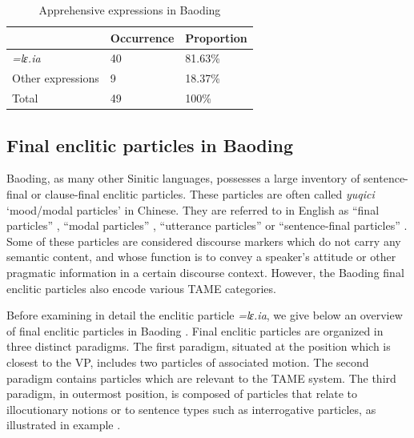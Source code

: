 \documentclass[output=paper,colorlinks,citecolor=brown, language=chinese]{langscibook}
\begin{document}
\begin{table}
\begin{tabularx}{.8\textwidth}{lYY}
\lsptoprule
 &  {Occurrence} &  {Proportion} \\
\midrule
\textit{=lɛ.ia}         & 40        & 81.63\%   \\
Other expressions       & 9         & 18.37\%   \\
\midrule
Total                   & 49        & 100\%     \\
\midrule
\end{tabularx}
\caption{Apprehensive expressions in Baoding}
\label{tab:song:1}
\end{table}


\subsection{Final enclitic particles in Baoding}
\label{subsec:finalparticle}

Baoding, as many other Sinitic languages, possesses a large inventory of sentence-final or clause-final enclitic particles. These particles are often called \textit{yuqici} `mood/modal particles' in Chinese. They are referred to in English as ``final particles'' \citep[149]{Chao1968}, ``modal particles'' \citep{Chappell1991}, ``utterance particles'' \citep{Luke1990} or ``sentence-final particles'' \citep[238]{LiThompson1981}. Some of these particles are considered discourse markers which do not carry any semantic content, and whose function is to convey a speaker's attitude or other pragmatic information in a certain discourse context. However, the Baoding final enclitic particles also encode various TAME categories. 

Before examining in detail the enclitic particle \textit{=lɛ.ia}, we give below an overview of final enclitic particles in Baoding \citep{song2020}. Final enclitic particles are organized in three distinct paradigms. The first paradigm, situated at the position which is closest to the VP, includes two particles of associated motion. The second paradigm contains particles which are relevant to the TAME system. The third paradigm, in outermost position, is composed of particles that relate to illocutionary notions or to sentence types such as interrogative particles, as illustrated in  example .
\end{document}
